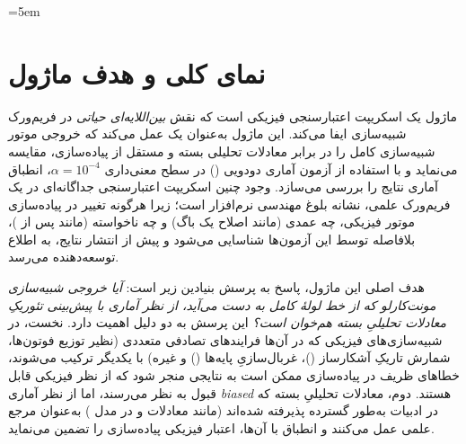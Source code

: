 \sloppy
\emergencystretch=5em



\section{نمای کلی و هدف ماژول}

ماژول  یک اسکریپت اعتبارسنجی فیزیکی است که نقش \emph{بین‌اللایه‌ای حیاتی} در فریم‌ورک شبیه‌سازی  ایفا می‌کند. این ماژول به‌عنوان یک  عمل می‌کند که خروجی موتور شبیه‌سازی کامل  را در برابر معادلات تحلیلی بسته و مستقل از پیاده‌سازی، مقایسه می‌نماید و با استفاده از آزمون آماری  دودویی () در سطح معنی‌داری $\alpha = 10^{-4}$، انطباق آماری نتایج را بررسی می‌سازد. وجود چنین اسکریپت اعتبارسنجی جداگانه‌ای در یک فریم‌ورک علمی، نشانه بلوغ مهندسی نرم‌افزار است؛ زیرا هرگونه تغییر در پیاده‌سازی موتور فیزیکی، چه عمدی (مانند اصلاح یک باگ) و چه ناخواسته (مانند  پس از )، بلافاصله توسط این آزمون‌ها شناسایی می‌شود و پیش از انتشار نتایج، به اطلاع توسعه‌دهنده می‌رسد.

هدف اصلی این ماژول، پاسخ به پرسش بنیادین زیر است:
\emph{آیا خروجی شبیه‌سازی مونت‌کارلو که از خط لولهٔ کامل
	به دست می‌آید، از نظر آماری با پیش‌بینی تئوریکِ معادلات تحلیلیِ بسته هم‌خوان است؟}
این پرسش به دو دلیل اهمیت دارد. نخست، در شبیه‌سازی‌های فیزیکی که در آن‌ها فرایندهای تصادفی متعددی (نظیر توزیع  فوتون‌ها، شمارش تاریکِ آشکارساز ()، غربال‌سازیِ پایه‌ها () و غیره) با یکدیگر ترکیب می‌شوند، خطاهای ظریف در پیاده‌سازی ممکن است به نتایجی منجر شود که از نظر فیزیکی قابل قبول به نظر می‌رسند، اما از نظر آماری \emph{biased} هستند. دوم، معادلات تحلیلیِ بسته که در ادبیات  به‌طور گسترده پذیرفته شده‌اند (مانند معادلات  و  در مدل ) به‌عنوان مرجع علمی عمل می‌کنند و انطباق با آن‌ها، اعتبار فیزیکی پیاده‌سازی را تضمین می‌نماید.


